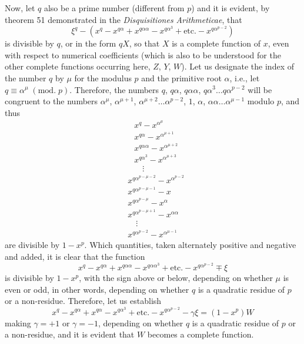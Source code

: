 \documentclass[twoside,12pt, showframe]{memoir}
\renewcommand{\pmod}[1]{\;(\textrm{mod.}\;#1)}
\begin{document}
Now, let \(q\) also be a prime number (different from \(p\)) and it is evident, by theorem 51 demonstrated in the \textit{Disquisitiones Arithmeticae}, that
\[\xi^{q}-(x^{q}-x^{q \alpha}+x^{q \alpha \alpha}-x^{q \alpha^{3}}+\text{etc.}-x^{q \alpha^{p-2}})\]
is divisible by \(q\), or in the form \(qX\), so that \(X\) is a complete function of \(x\), even with respect to numerical coefficients (which is also to be understood for the other complete functions occurring here, \(Z\), \(Y\), \(W\)). Let us designate the index of the number \(q\) by \(\mu\) for the modulus \(p\) and the primitive root \(\alpha\), i.e., let \(q \equiv \alpha^{\mu}\pmod{p}\). Therefore, the numbers \(q\), \(q \alpha\), \(q \alpha \alpha\), \(q \alpha^{3}\ldots q \alpha^{p-2}\) will be congruent to the numbers \(\alpha^{\mu}\), \(\alpha^{\mu+1}\), \(\alpha^{\mu+2}\ldots \alpha^{p-2}\), \(1\), \(\alpha\), \(\alpha \alpha\ldots \alpha^{\mu-1}\) modulo \(p\), and thus
\[\begin{aligned}
&x^{q}-x^{\alpha^{\mu}} \\
&x^{q \alpha}-x^{\alpha^{\mu+1}} \\
&x^{q \alpha \alpha}-x^{\alpha^{\mu+2}} \\
&x^{q \alpha^{3}}-x^{\alpha^{\mu+3}}\\
&\quad \vdots \end{aligned}\]
\[\begin{aligned}
&x^{q \alpha^{p-\mu-2}}-x^{\alpha^{p-2}}\\
&x^{q \alpha^{p-\mu-1}}-x\\
&x^{q \alpha^{p-\mu}}-x^{\alpha}\\
&x^{q \alpha^{p-\mu+1}}-x^{\alpha \alpha}\\
&\quad \vdots\\
&x^{q\alpha^{p-2}}-x^{\alpha^{\mu-1}}
\end{aligned}\]
are divisible by \(1-x^{p}\). Which quantities, taken alternately positive and negative and added, it is clear that the function
\[x^{q}-x^{q \alpha}+x^{q \alpha \alpha}-x^{q \alpha \alpha^{3}}+\text{etc.}-x^{q \alpha^{p-2}}\mp \xi\]
is divisible by \(1-x^{p}\), with the sign above or below, depending on whether \(\mu\) is even or odd, in other words, depending on whether \(q\) is a quadratic residue of \(p\) or a non-residue. Therefore, let us establish
\[x^{q}-x^{q \alpha}+x^{q \alpha}-x^{q \alpha^{3}}+\text{etc.}-x^{q \alpha^{p-2}}-\gamma \xi=(1-x^{p})W\]
making \(\gamma=+1\) or \(\gamma=-1\), depending on whether \(q\) is a quadratic residue of \(p\) or a non-residue, and it is evident that \(W\) becomes a complete function.
%
\end{document}
